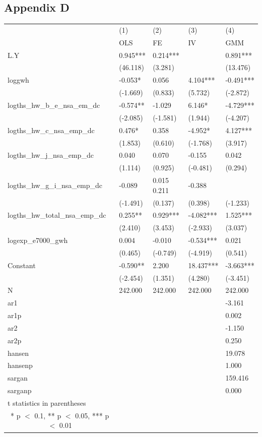 \documentclass[12pt]{article}
\begin{document}
\subsection{Appendix D}
\begin{tabular}{ p{5.2cm} p{2cm} p{2cm} p{2cm} p{2cm} }

  \hline
   &(1)&(2)&(3)&(4)\\
   &OLS&FE&IV&GMM\\
 \hline
 L.Y&0.945***&0.214***& &0.891***\\
  &(46.118)&(3.281)& &(13.476)\\
 loggwh&-0.053*&0.056&4.104***&-0.491***\\
  &(-1.669)&(0.833)&(5.732)&(-2.872)\\
logths\_hw\_b\_e\_nsa\_em\_dc&-0.574**&-1.029&6.146*&-4.729***\\
  &(-2.085)&(-1.581)&(1.944)&(-4.207)\\
 logths\_hw\_c\_nsa\_emp\_dc&0.476*&0.358	&-4.952*&4.127***\\
  &(1.853)&(0.610)&(-1.768)&(3.917)\\
logths\_hw\_j\_nsa\_emp\_dc&0.040&0.070&-0.155&0.042\\
  &(1.114)&(0.925)&(-0.481)&(0.294)\\
 logths\_hw\_g\_i\_nsa\_emp\_dc&-0.089&0.015	0.211&-0.388\\
  &(-1.491)&(0.137)&(0.398)&(-1.233)\\
logths\_hw\_total\_nsa\_emp\_dc&0.255**&0.929***&-4.082***&1.525***\\
  &(2.410)&(3.453)&(-2.933)&(3.037)\\
logexp\_e7000\_gwh&0.004&-0.010&-0.534***&0.021\\
  &(0.465)&(-0.749)&(-4.919)&(0.541)\\
 Constant&-0.590**&2.200&18.437***&-3.663***\\
  &(-2.454)&(1.351)&(4.280)&(-3.451)\\
 \hline
 N&242.000&242.000&242.000&242.000\\
 ar1& & & &-3.161\\
 ar1p& & & &0.002\\
 ar2& & & &-1.150\\
 ar2p& & & &0.250\\
hansen&	& &	&19.078\\
hansenp& & & &1.000\\
sargan&	& & &159.416\\
sarganp& & & &0.000\\
 \hline
 t statistics in parentheses\\
\multicolumn{1}{c}{* p $<$ 0.1, ** p $<$ 0.05, *** p $<$ 0.01} \\
\end{tabular}
\end{document}
